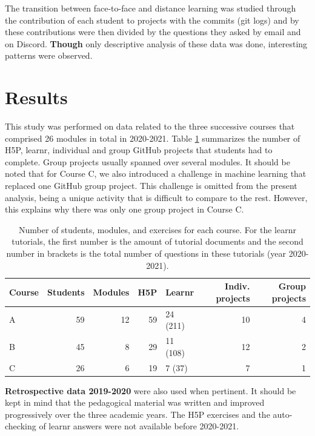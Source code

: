 \documentclass{aims}
\theoremstyle{definition}
\begin{document}
The transition between face-to-face and distance learning was studied
through the contribution of each student to projects with the commits
(git logs) and by these contributions were then divided by the questions
they asked by email and on Discord. \textbf{Though} only descriptive
analysis of these data was done, interesting patterns were observed.

\hypertarget{results}{%
\section{Results}\label{results}}

This study was performed on data related to the three successive courses
that comprised 26 modules in total in 2020-2021. Table
\ref {tab:tab_course} summarizes the number of H5P, learnr, individual
and group GitHub projects that students had to complete. Group projects
usually spanned over several modules. It should be noted that for Course
C, we also introduced a challenge in machine learning that replaced one
GitHub group project. This challenge is omitted from the present
analysis, being a unique activity that is difficult to compare to the
rest. However, this explains why there was only one group project in
Course C.

\begin{table}

\caption{\label{tab:tab_course_summary}\label{tab:tab_course} Number of students, modules, and exercises for each course. For the learnr tutorials, the first number is the amount of tutorial documents and the second number in brackets is the total number of questions in these tutorials (year 2020-2021).}
\centering
\begin{tabular}[t]{l|r|r|r|l|r|r}
\hline
Course & Students & Modules & H5P & Learnr & Indiv. projects & Group projects\\
\hline
A & 59 & 12 & 59 & 24 (211) & 10 & 4\\
\hline
B & 45 & 8 & 29 & 11 (108) & 12 & 2\\
\hline
C & 26 & 6 & 19 & 7 (37) & 7 & 1\\
\hline
\end{tabular}
\end{table}

\textbf{Retrospective data 2019-2020} \cite{Grosjeandataset2019} were
also used when pertinent. It should be kept in mind that the pedagogical
material was written and improved progressively over the three academic
years. The H5P exercises and the auto-checking of learnr answers were
not available before 2020-2021.
\end{document}
